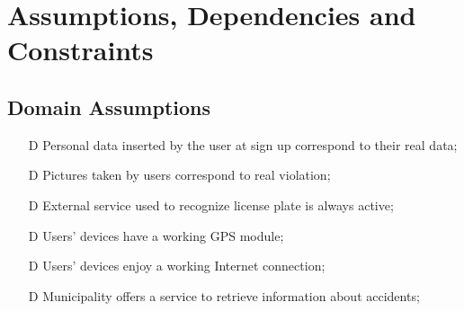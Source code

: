 \documentclass[../../rasd.tex]{subfiles}
\begin{document}
\section{Assumptions, Dependencies and Constraints}
	\subsection{Domain Assumptions}
	 	\begin{itemize}
	 		\item[D\subs{1}]Personal data inserted by the user at sign up correspond to their real data;
	 		\item[D\subs{2}]Pictures taken by users correspond to real violation;
	 		\item[D\subs{3}]External service used to recognize license plate is always active;
	 		\item[D\subs{4}]Users’ devices have a working GPS module;
	 		\item[D\subs{5}]Users’ devices enjoy a working Internet connection; 
	 		\item[D\subs{6}]Municipality offers a service to retrieve information about accidents;
	 		
	 	\end{itemize}
\end{document}
